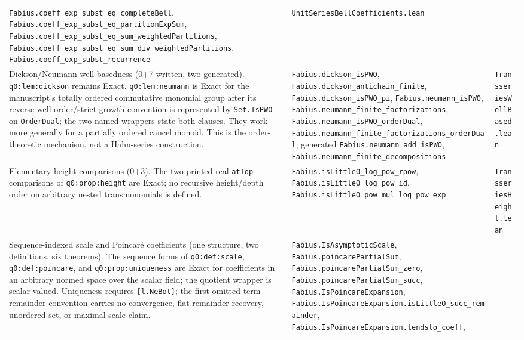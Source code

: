\documentclass[11pt,oneside]{article}
\theoremstyle{definition}
\theoremstyle{remark}
\begin{document}
\begin{longtable}{@{}p{}p{}p{}@{}}
\nolinkurl{Fabius.coeff_exp_subst_eq_completeBell},
\nolinkurl{Fabius.coeff_exp_subst_eq_partitionExpSum},
\nolinkurl{Fabius.coeff_exp_subst_eq_sum_weightedPartitions},
\nolinkurl{Fabius.coeff_exp_subst_eq_sum_div_weightedPartitions},
\nolinkurl{Fabius.coeff_exp_subst_recurrence} &
\nolinkurl{UnitSeriesBellCoefficients.lean} \\
Dickson/Neumann well-basedness (0+7 written, two generated).
\nolinkurl{q0:lem:dickson} remains Exact.  \nolinkurl{q0:lem:neumann} is Exact
for the manuscript's totally ordered commutative monomial group after its
reverse-well-order/strict-growth convention is represented by
\nolinkurl{Set.IsPWO} on \nolinkurl{OrderDual}; the two named wrappers state
both clauses.  They work more generally for a partially ordered cancel monoid.
This is the order-theoretic mechanism, not a Hahn-series construction. &
\nolinkurl{Fabius.dickson_isPWO},
\nolinkurl{Fabius.dickson_antichain_finite},
\nolinkurl{Fabius.dickson_isPWO_pi},
\nolinkurl{Fabius.neumann_isPWO},
\nolinkurl{Fabius.neumann_finite_factorizations},
\nolinkurl{Fabius.neumann_isPWO_orderDual},
\nolinkurl{Fabius.neumann_finite_factorizations_orderDual}; generated
\nolinkurl{Fabius.neumann_add_isPWO},
\nolinkurl{Fabius.neumann_finite_decompositions} &
\nolinkurl{TransseriesWellBased.lean} \\
Elementary height comparisons (0+3).  The two printed real
\nolinkurl{atTop} comparisons of \nolinkurl{q0:prop:height} are Exact; no
recursive height/depth order on arbitrary nested transmonomials is defined. &
\nolinkurl{Fabius.isLittleO_log_pow_rpow},
\nolinkurl{Fabius.isLittleO_log_pow_id},
\nolinkurl{Fabius.isLittleO_pow_mul_log_pow_exp} &
\nolinkurl{TransseriesHeight.lean} \\
Sequence-indexed scale and Poincar\'e coefficients (one structure, two
definitions, six theorems).  The sequence forms of
\nolinkurl{q0:def:scale}, \nolinkurl{q0:def:poincare}, and
\nolinkurl{q0:prop:uniqueness} are Exact for coefficients in an arbitrary
normed space over the scalar field; the quotient wrapper is scalar-valued.
Uniqueness requires \nolinkurl{[l.NeBot]}; the first-omitted-term remainder
convention carries no convergence, flat-remainder recovery, unordered-set, or
maximal-scale claim. &
\nolinkurl{Fabius.IsAsymptoticScale},
\nolinkurl{Fabius.poincarePartialSum},
\nolinkurl{Fabius.poincarePartialSum_zero},
\nolinkurl{Fabius.poincarePartialSum_succ},
\nolinkurl{Fabius.IsPoincareExpansion},
\nolinkurl{Fabius.IsPoincareExpansion.isLittleO_succ_remainder},
\nolinkurl{Fabius.IsPoincareExpansion.tendsto_coeff},

\end{longtable}
\end{document}
